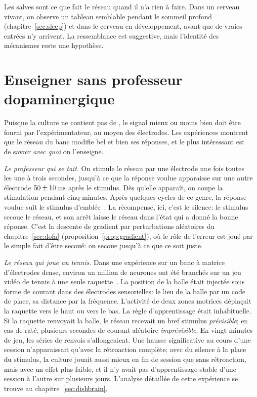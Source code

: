 Les salves sont ce que fait le réseau quand il n'a rien à faire. Dans un cerveau vivant, on observe un tableau semblable pendant le sommeil profond (chapitre~\ref{sec:sleep}) et dans le cerveau en développement, avant que de vraies entrées n'y arrivent. La ressemblance est suggestive, mais l'identité des mécanismes reste une hypothèse.

\section{Enseigner sans professeur dopaminergique}

Puisque la culture ne contient pas de , le signal \og mieux ou moins bien\fg{} doit être fourni par l'expérimentateur, au moyen des électrodes. Les expériences montrent que le réseau du banc modifie bel et bien ses réponses, et le plus intéressant est de savoir \emph{avec quoi} on l'enseigne.

\emph{Le professeur qui se tait.} On stimule le réseau par une électrode une fois toutes les une à trois secondes, jusqu'à ce que la réponse voulue apparaisse sur une autre électrode $50\pm10\,\text{ms}$ après le stimulus. Dès qu'elle apparaît, on coupe la stimulation pendant cinq minutes. Après quelques cycles de ce genre, la réponse voulue suit le stimulus d'emblée~\cite{Shahaf2001}. La récompense, ici, c'est le silence: le stimulus secoue le réseau, et son arrêt laisse le réseau dans l'état qui a donné la bonne réponse. C'est la descente de gradient par perturbations aléatoires du chapitre~\ref{sec:dofa} (proposition~\ref{prop:gradient}), où le rôle de l'erreur est joué par le simple fait d'être secoué: on secoue jusqu'à ce que ce soit juste.

\emph{Le réseau qui joue au tennis.} Dans une expérience sur un banc à matrice d'électrodes dense, environ un million de neurones ont été branchés sur un jeu vidéo de tennis à une seule raquette~\cite{Kagan2022}. La position de la balle était injectée sous forme de courant dans des électrodes \og sensorielles\fg{}: le lieu de la balle par un code de place, sa distance par la fréquence. L'activité de deux zones \og motrices\fg{} déplaçait la raquette vers le haut ou vers le bas. La règle d'apprentissage était inhabituelle. Si la raquette renvoyait la balle, le réseau recevait un bref stimulus \emph{prévisible}; en cas de raté, plusieurs secondes de courant aléatoire \emph{imprévisible}. En vingt minutes de jeu, les séries de renvois s'allongeaient. Une hausse significative au cours d'une session n'apparaissait qu'avec la rétroaction complète; avec du silence à la place du stimulus, la culture jouait aussi mieux en fin de session que sans rétroaction, mais avec un effet plus faible, et il n'y avait pas d'apprentissage stable d'une session à l'autre sur plusieurs jours. L'analyse détaillée de cette expérience se trouve au chapitre~\ref{sec:dishbrain}.

